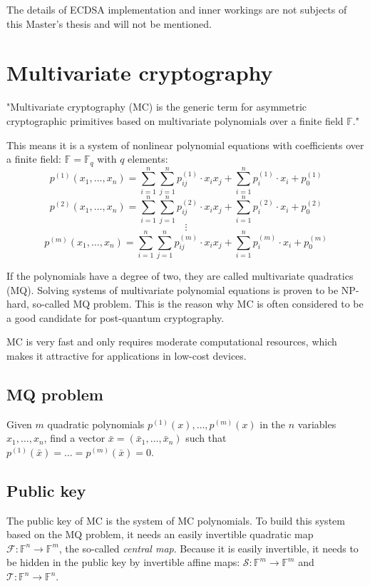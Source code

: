 \documentclass[thesis=M,english]{FITthesis}[2019/12/23]
\begin{document}
\bigskip
\noindent
The details of ECDSA implementation and inner workings are not subjects of this Master's thesis and will not be mentioned.

\newpage
\section{Multivariate cryptography}
"Multivariate cryptography (MC) is the generic term for asymmetric cryptographic primitives based on multivariate polynomials over a finite field $\mathbb{F}$."\cite{L-WIKI1}

This means it is a system of nonlinear polynomial equations with coefficients over a finite field:
 $\mathbb{F} = \mathbb{F}_q$ with $q$ elements:
\[
p^{(1)}(x_1,\ldots,x_n) = \sum\limits_{i=1}^{n} {\sum\limits_{j=1}^{n} {p_{ij}^{(1)} \cdot x_ix_j}} + \sum\limits_{i=1}^{n} {p_{i}^{(1)} \cdot x_i} + p_0^{(1)}
\]
\[
p^{(2)}(x_1,\ldots,x_n) = \sum\limits_{i=1}^{n} {\sum\limits_{j=1}^{n} {p_{ij}^{(2)} \cdot x_ix_j}} + \sum\limits_{i=1}^{n} {p_{i}^{(2)} \cdot x_i} + p_0^{(2)}
\]
\[
\vdots
\]
\[
p^{(m)}(x_1,\ldots,x_n) = \sum\limits_{i=1}^{n} {\sum\limits_{j=1}^{n} {p_{ij}^{(m)} \cdot x_ix_j}} + \sum\limits_{i=1}^{n} {p_{i}^{(m)} \cdot x_i} + p_0^{(m)}
\]

If the polynomials have a degree of two, they are called multivariate quadratics (MQ). Solving systems of multivariate polynomial equations is proven to be NP-hard, so-called MQ problem. This is the reason why MC is often considered to be a good candidate for post-quantum cryptography.

MC is very fast and only requires moderate computational resources, which makes it attractive for applications in low-cost devices.

\subsection{MQ problem}
Given $m$ quadratic polynomials $p^{(1)}(x),\ldots,p^{(m)}(x)$ in the $n$ variables $x_1,\ldots,x_n$, find a vector $\bar{x} = (\bar{x}_1,\ldots,\bar{x}_n)$ such that $p^{(1)}(\bar{x}) = \ldots = p^{(m)}(\bar{x}) = 0$.

\subsection{Public key}
The public key of MC is the system of MC polynomials. To build this system based on the MQ problem, it needs an easily invertible quadratic map $\mathcal{F}: \mathbb{F}^n \rightarrow \mathbb{F}^m$, the so-called \textit{central map}. Because it is easily invertible, it needs to be hidden in the public key by invertible affine maps: $\mathcal{S}: \mathbb{F}^m \rightarrow \mathbb{F}^m$ and $\mathcal{T}: \mathbb{F}^n \rightarrow \mathbb{F}^n$.
\end{document}
